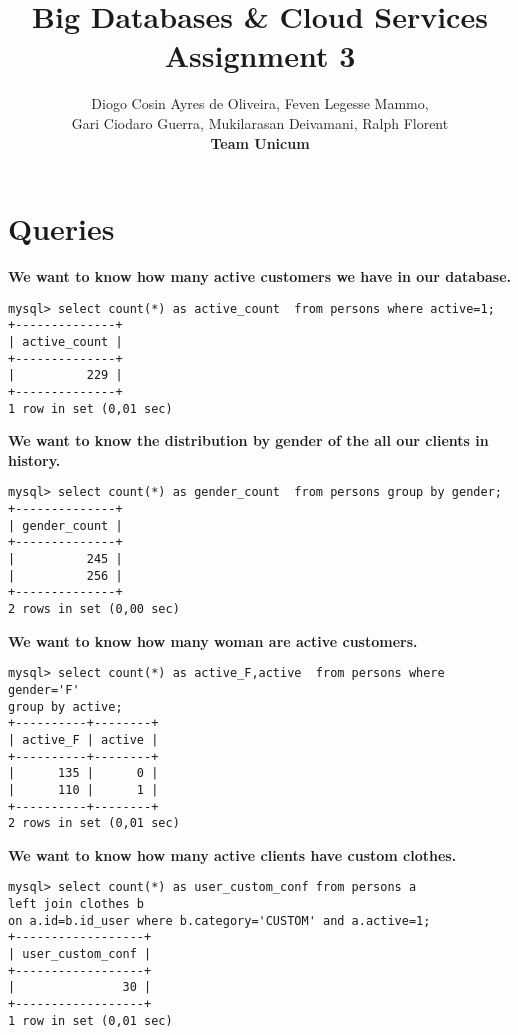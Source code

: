 \documentclass[]{article}
\title{Big Databases \& Cloud Services Assignment 3}
\author{Diogo Cosin Ayres de Oliveira, Feven Legesse Mammo,\\ Gari Ciodaro Guerra, Mukilarasan Deivamani, Ralph Florent\\ \textbf{Team Unicum}}
\begin{document}
\maketitle



\section{Queries}

\textbf{We want to know how many active customers we have in our database.}
\begin{verbatim}
mysql> select count(*) as active_count  from persons where active=1;
+--------------+
| active_count |
+--------------+
|          229 |
+--------------+
1 row in set (0,01 sec)
\end{verbatim}



\textbf{We want to know the distribution by gender of the all our clients in history.}
\begin{verbatim}
mysql> select count(*) as gender_count  from persons group by gender;
+--------------+
| gender_count |
+--------------+
|          245 |
|          256 |
+--------------+
2 rows in set (0,00 sec)
\end{verbatim}

\textbf{We want to know how many woman are active customers.}
\begin{verbatim}
mysql> select count(*) as active_F,active  from persons where gender='F' 
group by active;
+----------+--------+
| active_F | active |
+----------+--------+
|      135 |      0 |
|      110 |      1 |
+----------+--------+
2 rows in set (0,01 sec)
\end{verbatim}



\textbf{We want to know how many active clients have custom clothes.}
\begin{verbatim}
mysql> select count(*) as user_custom_conf from persons a 
left join clothes b  
on a.id=b.id_user where b.category='CUSTOM' and a.active=1;
+------------------+
| user_custom_conf |
+------------------+
|               30 |
+------------------+
1 row in set (0,01 sec)
\end{verbatim}
\end{document}

